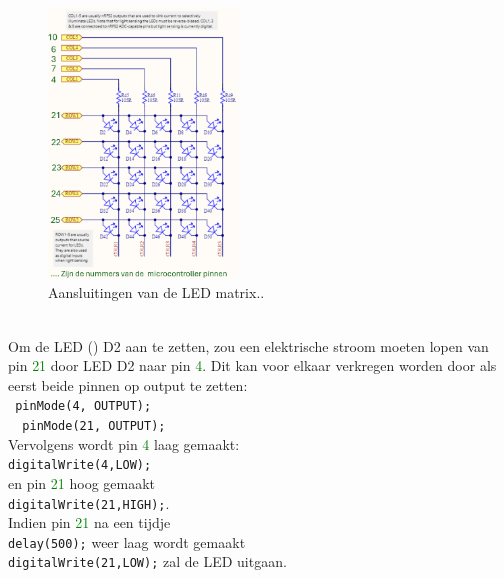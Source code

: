 \begin{minipage}{\linewidth}
	\begin{figure}
		\vspace{-15pt}
		\begin{center}
			\centering
			\captionsetup{justification=centering}
			\includegraphics[width=0.45\textwidth]{figuren/LedMatrixV2Mnr}
		\end{center}
		\caption{Aansluitingen van de LED matrix..}
		\label{fig:ledmtx2}
	\end{figure}
	
~\vspace{2mm}\\
	Om de LED  () D2 aan te zetten, zou een elektrische stroom moeten lopen van  pin  \textcolor {Green}{21} door LED D2 naar pin \textcolor{Green}{4}.
	Dit kan voor elkaar verkregen worden door als eerst beide pinnen op output te zetten:\\
	\lstinline|	pinMode(4, OUTPUT);|\\ \lstinline|	pinMode(21, OUTPUT);|\\
	Vervolgens wordt pin \textcolor {Green}{4} laag gemaakt:\\
	 \lstinline|digitalWrite(4,LOW);|\\ en pin \textcolor {Green}{21} hoog gemaakt\\ \lstinline|digitalWrite(21,HIGH);|.\\
	 Indien pin \textcolor {Green}{21}  na een tijdje\\ \lstinline|delay(500);| weer laag wordt gemaakt\\ \lstinline|digitalWrite(21,LOW);| zal de LED uitgaan.
\end{minipage}



